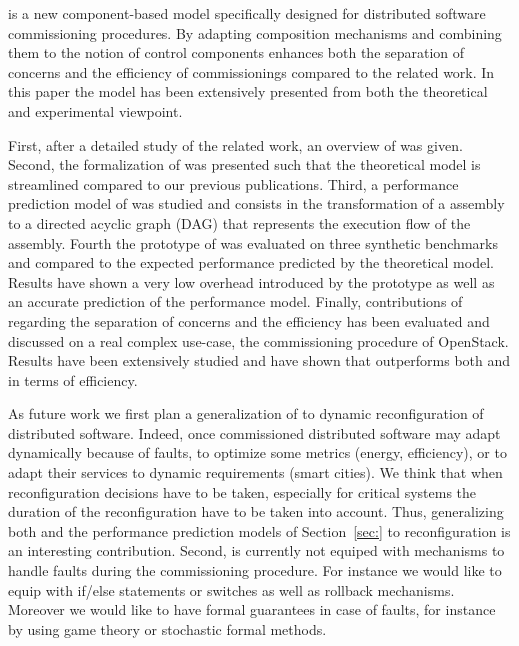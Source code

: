 \mad is a new component-based model specifically designed for
distributed software commissioning procedures. By adapting composition
mechanisms and combining them to the notion of control components \mad
enhances both the separation of concerns and the efficiency of
commissionings compared to the related work. In this paper the \mad
model has been extensively presented from both the theoretical and
experimental viewpoint.

First, after a detailed study of the related work, an overview of \mad
was given. Second, the formalization of \mad was presented such that
the theoretical model is streamlined compared to our previous
publications. Third, a performance prediction model of \mad was
studied and consists in the transformation of a \mad assembly to a
directed acyclic graph (DAG) that represents the execution flow of the
assembly. Fourth the prototype of \mad was evaluated on three
synthetic benchmarks and compared to the expected performance
predicted by the theoretical model. Results have shown a very low
overhead introduced by the prototype as well as an accurate prediction
of the performance model. Finally, contributions of \mad regarding the
separation of concerns and the efficiency has been evaluated and
discussed on a real complex use-case, the commissioning procedure of
OpenStack. Results have been extensively studied and have shown that
\mad outperforms both \ansible and \aeolus in terms of efficiency.

As future work we first plan a generalization of \mad to dynamic
reconfiguration of distributed software. Indeed, once commissioned
distributed software may adapt dynamically because of faults, to
optimize some metrics (\eg energy, efficiency), or to adapt their
services to dynamic requirements (\eg smart cities). We think that
when reconfiguration decisions have to be taken, especially for
critical systems the duration of the reconfiguration have to be taken
into account. Thus, generalizing both \mad and the performance
prediction models of Section~\ref{sec:} to reconfiguration is an
interesting contribution. Second, \mad is currently not equiped with
mechanisms to handle faults during the commissioning procedure. For
instance we would like to equip \mad with if/else statements or
switches as well as rollback mechanisms. Moreover we would like to
have formal guarantees in case of faults, for instance by using game
theory or stochastic formal methods. 

  